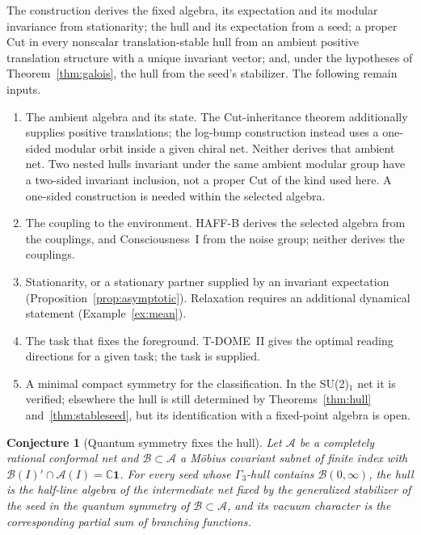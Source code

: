 \documentclass[12pt]{article}
\newtheorem{conjecture}[theorem]{Conjecture}
\theoremstyle{definition}
\theoremstyle{remark}
\begin{document}
The construction derives the fixed algebra, its expectation and its modular invariance
from stationarity; the hull and its expectation from a seed; a proper Cut in every
nonscalar translation-stable hull from an ambient positive translation structure with a unique invariant vector;
and, under the hypotheses of Theorem~\ref{thm:galois}, the hull from the seed's
stabilizer. The following remain inputs.
\begin{enumerate}[label=(\arabic*),leftmargin=2em]
\item The ambient algebra and its state. The Cut-inheritance theorem additionally
  supplies positive translations; the log-bump construction instead uses a
  one-sided modular orbit inside a given chiral net. Neither derives that
  ambient net. Two nested hulls invariant under the same ambient modular
  group have a two-sided invariant inclusion, not a proper Cut of the kind
  used here. A one-sided construction is needed within the selected algebra.
\item The coupling to the environment. HAFF-B derives the selected algebra from the
  couplings, and Consciousness~I from the noise group; neither derives the couplings.
\item Stationarity, or a stationary partner supplied by an invariant
  expectation (Proposition~\ref{prop:asymptotic}). Relaxation requires
  an additional dynamical statement (Example~\ref{ex:mean}).
\item The task that fixes the foreground. T-DOME~II gives the optimal reading directions
  for a given task; the task is supplied.
\item A minimal compact symmetry for the classification. In the SU(2)\(_1\) net it is
  verified; elsewhere the hull is still determined by Theorems~\ref{thm:hull}
  and~\ref{thm:stableseed}, but its identification with a fixed-point algebra is open.
\end{enumerate}

\begin{conjecture}[Quantum symmetry fixes the hull]\label{conj:quantum}
Let \(\mathcal A\) be a completely rational conformal net and \(\mathcal B\subset\mathcal A\)
a M\"obius covariant subnet of finite index with \(\mathcal B(I)'\cap\mathcal A(I)=\mathbb C\mathbf 1\).
For every seed whose \(\Gamma_3\)-hull contains \(\mathcal B(0,\infty)\), the hull is the
half-line algebra of the intermediate net fixed by the generalized stabilizer of the
seed in the quantum symmetry of \(\mathcal B\subset\mathcal A\), and its vacuum character
is the corresponding partial sum of branching functions.
\end{conjecture}
\end{document}

